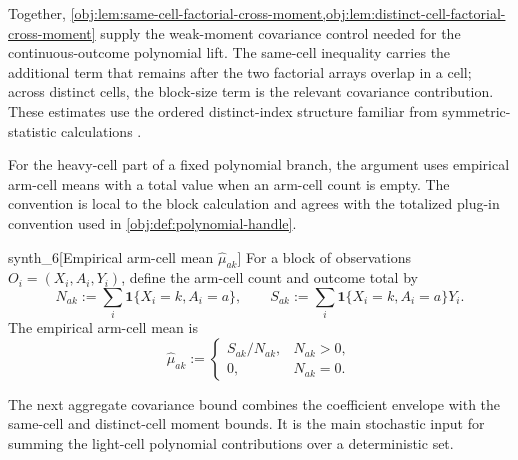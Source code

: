 Together, \cref{obj:lem:same-cell-factorial-cross-moment,obj:lem:distinct-cell-factorial-cross-moment} supply the weak-moment covariance control needed for the continuous-outcome polynomial lift. The same-cell inequality carries the additional term that remains after the two factorial arrays overlap in a cell; across distinct cells, the block-size term is the relevant covariance contribution. These estimates use the ordered distinct-index structure familiar from symmetric-statistic calculations \citep{Hoeffding1948,Serfling1980}.

For the heavy-cell part of a fixed polynomial branch, the argument uses empirical arm-cell means with a total value when an arm-cell count is empty. The convention is local to the block calculation and agrees with the totalized plug-in convention used in \cref{obj:def:polynomial-handle}.

\begin{definitionv}{synth_6}[Empirical arm-cell mean \(\widehat\mu_{ak}\)]
For a block of observations \(O_i=(X_i,A_i,Y_i)\), define the arm-cell count and outcome total by \[N_{ak}:=\sum_i \mathbf 1\{X_i=k,A_i=a\},\qquad S_{ak}:=\sum_i \mathbf 1\{X_i=k,A_i=a\}Y_i .\] The empirical arm-cell mean is \[\widehat\mu_{ak}:=\begin{cases}S_{ak}/N_{ak},&N_{ak}>0,\\ 0,&N_{ak}=0.\end{cases}\]
\end{definitionv}

The next aggregate covariance bound combines the coefficient envelope with the same-cell and distinct-cell moment bounds. It is the main stochastic input for summing the light-cell polynomial contributions over a deterministic set.

